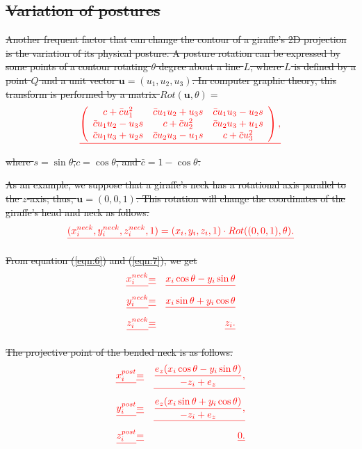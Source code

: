 \documentclass[journal]{IEEEtran}
\providecommand{\DIFdel}[1]{{\protect\color{red}\sout{#1}}}                      %
\begin{document}
\subsection{\DIFdel{Variation of postures}}
\addtocounter{subsection}{-1}%

\DIFdel{Another frequent factor that can change the contour of a giraffe's 2D projection is the variation of its physical posture. 
A posture rotation can be expressed by some points of a contour rotating $\theta$ degree about a line $L$, 
where $L$ is defined by a point $Q$ and a unit vector $\mathbf{u}=(u_1,u_2,u_3)$. 
In computer graphic theory, this transform is performed by a matrix $Rot(\mathbf{u},\theta)=$
}\begin{displaymath}\DIFdel{
\left(
\begin{array}{ccc}
 c+\bar{c}u_1^2 
& \bar{c}u_1 u_2+u_3 s 
& \bar{c}u_1 u_3-u_2 s \\
 \bar{c}u_1 u_2-u_3 s 
& c+\bar{c}u_2^2 
& \bar{c}u_2 u_3+u_1 s \\
 \bar{c}u_1 u_3+u_2 s 
& \bar{c}u_2 u_3-u_1 s 
& c+\bar{c}u_3^2
\end{array}\right),
\label{eqn:6}
}\end{displaymath} 
\DIFdel{where $s=\sin\theta$,$c=\cos\theta$, and $\bar{c}=1-\cos\theta$.
}%

\DIFdel{As an example, we suppose that a giraffe's neck has a rotational axis parallel to the $z$-axis; 
thus, $\mathbf{u} = (0,0,1)$. 
This rotation will change the coordinates of the giraffe's head and neck as follows.
}\begin{displaymath}\DIFdel{
(x_i^{neck},y_i^{neck},z_i^{neck},1)=(x_i,y_i,z_i,1)\cdot Rot((0,0,1),\theta).
\label{eqn:7}
}\end{displaymath}

\DIFdel{From equation (\ref{eqn:6}) and (\ref{eqn:7}), we get
}\begin{align*}\DIFdel{
x_i^{neck}}&\DIFdel{=}&\DIFdel{x_i\cos\theta-y_i\sin\theta\nonumber}\\
\DIFdel{y_i^{neck}}&\DIFdel{=}&\DIFdel{x_i\sin\theta+y_i\cos\theta\nonumber}\\
\DIFdel{z_i^{neck}}&\DIFdel{=}&\DIFdel{z_i.
}\end{align*}

\DIFdel{The projective point of the bended neck is as follows.
}\begin{align*}\DIFdel{
x_i^{post}}&\DIFdel{=}&\DIFdel{\frac{e_z(x_i\cos\theta-y_i\sin\theta)}{-z_i+e_z}, \nonumber}\\
\DIFdel{y_i^{post}}&\DIFdel{=}&\DIFdel{\frac{e_z(x_i\sin\theta+y_i\cos\theta)}{-z_i+e_z}, \nonumber}\\
\DIFdel{z_i^{post}}&\DIFdel{=}&\DIFdel{0.
\label{eqn:9}
}\end{align*}
\end{document}
